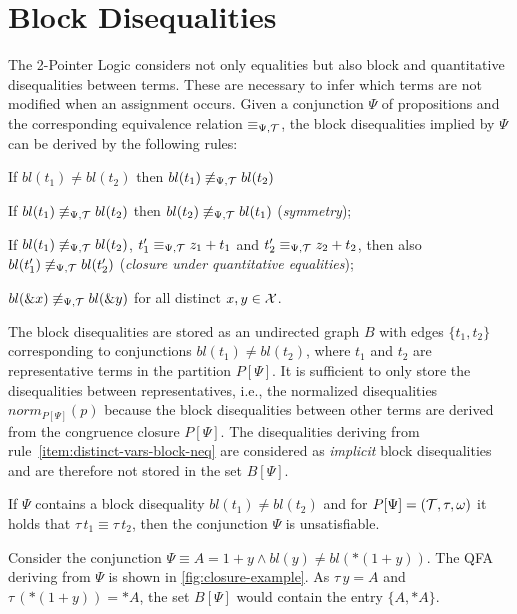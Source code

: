 \section{Block Disequalities}\label{section:block-disequalities}

The 2-Pointer Logic considers not only equalities but also block and quantitative disequalities between terms.
These are necessary to infer which terms are not
modified when an assignment occurs.
Given a conjunction $\Psi$ of propositions and the corresponding equivalence relation $\equiv_{\Psi,\mathcal{T}}$, the block disequalities implied by $\Psi$ can be derived by the following rules:\cite{c2po}

\begin{enumerate}[label={[B\arabic*]}, ref={[B\arabic*]}]
    \setcounter{enumi}{-1} %
    \item If $bl(t_1)\neq bl(t_2)$ then $bl(t_1)\not\equiv_{\Psi,\mathcal{T}} bl(t_2)$
    \item If $bl(t_1)\not\equiv_{\Psi,\mathcal{T}} bl(t_2)$ then $bl(t_2)\not\equiv_{\Psi,\mathcal{T}} bl(t_1)$
          (\emph{symmetry});
          \item\label{item:closure-under-quantitative-equalities}
          If $bl(t_1)\not\equiv_{\Psi,\mathcal{T}} bl(t_2)$, $t'_1 \equiv_{\Psi,\mathcal{T}} z_1+t_1$ and $t'_2\equiv_{\Psi,\mathcal{T}} z_2+t_2$, then
          also $bl(t'_1)\not\equiv_{\Psi,\mathcal{T}} bl(t'_2)$ (\emph{closure under quantitative equalities});
          \item\label{item:distinct-vars-block-neq} $bl(\&x) \not\equiv_{\Psi,\mathcal{T}} bl(\&y)$ for all distinct $x, y \in \mathcal{X}$.
\end{enumerate}

The block disequalities are stored as an undirected graph $B$
with edges $\{t_1,t_2\}$ corresponding to conjunctions $bl(t_1) \neq bl(t_2)$,
where $t_1$ and $t_2$ are representative terms in the partition $P[\Psi]$.
It is sufficient to only store the disequalities between representatives, i.e.,
the normalized disequalities $norm_{P[\Psi]}(p)$ because
the block disequalities between other terms are derived from the congruence closure $P[\Psi]$.
The disequalities deriving from rule~\ref{item:distinct-vars-block-neq} are considered as \emph{implicit} block disequalities and are therefore not stored in the set $B[\Psi]$.

If $\Psi$ contains a block disequality $bl(t_1) \neq bl(t_2)$ and for $P[\Psi] = (\mathcal{T}, \tau, \omega)$ it holds that
$\tau\,t_1 \equiv \tau\,t_2$, then the conjunction $\Psi$ is unsatisfiable.

\begin{example}\label{ex:bldiseq}
    Consider the conjunction $\Psi \equiv A = 1 + y \land bl(y) \neq bl(*(1 + y))$.
    The QFA deriving from $\Psi$ is shown in \cref{fig:closure-example}.
    As $\tau\,y = A$ and $\tau\,(*(1+y)) = *A$, the set $B[\Psi]$ would contain the entry $\{A,*A\}$.
\end{example}

